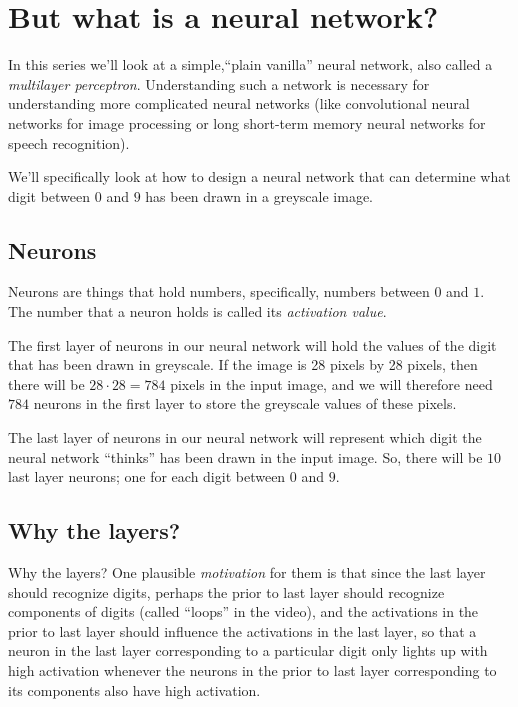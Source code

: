 \documentclass{article}
\begin{document}
	\section*{But what is a neural network?}
	
	In this series we'll look at a simple,``plain vanilla'' neural network, also called a \textit{multilayer perceptron}. Understanding such a network is necessary for understanding more complicated neural networks (like convolutional neural networks for image processing or long short-term memory neural networks for speech recognition).
	
	We'll specifically look at how to design a neural network that can determine what digit between $0$ and $9$ has been drawn in a greyscale image.
	
	\subsection*{Neurons}
	
	Neurons are things that hold numbers, specifically, numbers between $0$ and $1$. The number that a neuron holds is called its \textit{activation value}.
	
	The first layer of neurons in our neural network will hold the values of the digit that has been drawn in greyscale. If the image is 28 pixels by 28 pixels, then there will be $28 \cdot 28 = 784$ pixels in the input image, and we will therefore need $784$ neurons in the first layer to store the greyscale values of these pixels.
	
	The last layer of neurons in our neural network will represent which digit the neural network ``thinks'' has been drawn in the input image. So, there will be $10$ last layer neurons; one for each digit between $0$ and $9$.
	
	\subsection*{Why the layers?}
	
	Why the layers? One plausible \textit{motivation} for them is that since the last layer should recognize digits, perhaps the prior to last layer should recognize components of digits (called ``loops'' in the video), and the activations in the prior to last layer should influence the activations in the last layer, so that a neuron in the last layer corresponding to a particular digit only lights up with high activation whenever the neurons in the prior to last layer corresponding to its components also have high activation.
	
\end{document}
